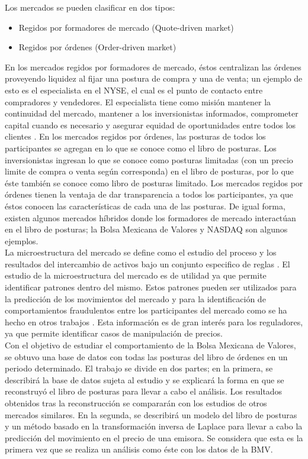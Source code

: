 \documentclass[11pt]{article}
\numberwithin{equation}{section} %
\begin{document}
Los mercados se pueden clasificar en dos tipos:
\begin{itemize}
  \item Regidos por formadores de mercado (Quote-driven market)
  \item Regidos por órdenes (Order-driven market)
\end{itemize}

En los mercados regidos por formadores de mercado, éstos centralizan las órdenes proveyendo liquidez al fijar una postura de compra y una de venta; un ejemplo de esto es el especialista en el NYSE, el cual es el punto de contacto entre compradores y vendedores. El especialista tiene como misión mantener la continuidad del mercado, mantener a los inversionistas informados, comprometer capital cuando es necesario y asegurar equidad de oportunidades entre todos los clientes \cite{nyse}. En los mercados regidos por órdenes, las posturas de todos los participantes se agregan en lo que se conoce como el libro de posturas. Los inversionistas ingresan lo que se conoce como posturas limitadas (con un precio limite de compra o venta según corresponda) en el libro de posturas, por lo que éste también se conoce como libro de posturas limitado. Los mercados regidos por órdenes tienen la ventaja de dar transparencia a todos los participantes, ya que éstos conocen las características de cada una de las posturas. De igual forma, existen algunos mercados híbridos donde los formadores de mercado interactúan en el libro de posturas; la Bolsa Mexicana de Valores y NASDAQ son algunos ejemplos.\\

La microestructura del mercado se define como el estudio del proceso y los resultados del intercambio de activos bajo un conjunto especifico de reglas \cite{1995market}. El estudio de la microestructura del mercado es de utilidad ya que permite identificar patrones dentro del mismo. Estos patrones pueden ser utilizados para la predicción de los movimientos del mercado y para la identificación de comportamientos fraudulentos entre los participantes del mercado como se ha hecho en otros trabajos \cite{manipulation}. Esta información es de gran interés para los reguladores, ya que permite identificar casos de manipulación de precios.
\\

Con el objetivo de estudiar el comportamiento de la Bolsa Mexicana de Valores, se obtuvo una base de datos con todas las posturas del libro de órdenes en un periodo determinado. El trabajo se divide en dos partes; en la primera, se describirá la base de datos sujeta al estudio y se explicará la forma en que se reconstruyó el libro de posturas para llevar a cabo el análisis. Los resultados obtenidos tras la reconstrucción se compararán con los estudios de otros mercados similares. En la segunda, se describirá un modelo del libro de posturas y un método basado en la transformación inversa de Laplace para llevar a cabo la predicción del movimiento en el precio de una emisora. Se considera que esta es la primera vez que se realiza un análisis como éste con los datos de la BMV.
\end{document}
